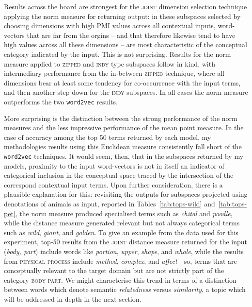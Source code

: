 Results across the board are strongest for the \textsc{joint} dimension selection technique applying the norm measure for returning output: in these subspaces selected by choosing dimensions with high PMI values across all contextual inputs, word-vectors that are far from the orgins -- and that therefore likewise tend to have high values across all these dimensions -- are most characteristic of the conceptual category indicated by the input.  This is not surprising.  Results for the norm measure applied to \textsc{zipped} and \textsc{indy} type subspaces follow in kind, with intermediary performance from the in-between \textsc{zipped} technique, where all dimensions bear at least some tendency for co-occurrence with the input terms, and then another step down for the \textsc{indy} subspaces.  In all cases the norm measure outperforms the two \texttt{word2vec} results.

More surprising is the distinction between the strong performance of the norm measures and the less impressive performance of the mean point measure.  In the case of accuracy among the top 50 terms returned by each model, my methodologies results using this Euclidean measure consistently fall short of the \texttt{word2vec} techniques.  It would seem, then, that in the subspaces returned by my models, proximity to the input word-vectors is not in itself an indicator of categorical inclusion in the conceptual space traced by the intersection of the correspond contextual input terms.  Upon further consideration, there is a plausible explanation for this: revisiting the outputs for subspaces projected using denotations of animals as input, reported in Tables~\ref{tab:tops-wild} and~\ref{tab:tops-pet}, the norm measure produced specialised terms such as \emph{chital} and \emph{poodle}, while the distance measure generated relevant but not always categorical terms such as \emph{wild}, \emph{giant}, and \emph{golden}.  To give an example from the data used for this experiment, top-50 results from the \textsc{joint} distance measure returned for the input (\emph{body, part}) include words like \emph{portion}, \emph{upper}, \emph{shape}, and \emph{whole}, while the results from \textsc{physical process} include \emph{method}, \emph{complex}, and \emph{affect}---so, terms that are conceptually relevant to the target domain but are not strictly part of the category \textsc{body part}.  We might characterise this trend in terms of a distinction between words which denote semantic \emph{relatedness} versus \emph{similarity}, a topic which will be addressed in depth in the next section.

